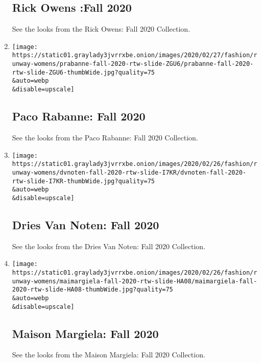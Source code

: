 \begin{enumerate}
{  \subsection{Rick Owens :Fall 2020}\label{rick-owens-fall-2020}}

  See the looks from the Rick Owens: Fall 2020 Collection.
\item
  \href{/slideshow/2020/02/27/fashion/runway-womens/paco-rabanne-fall-2020.html}{}

  \texttt{[image: https://static01.graylady3jvrrxbe.onion/images/2020/02/27/fashion/runway-womens/prabanne-fall-2020-rtw-slide-ZGU6/prabanne-fall-2020-rtw-slide-ZGU6-thumbWide.jpg?quality=75\\\&auto=webp\\\&disable=upscale]}

  \hypertarget{paco-rabanne-fall-2020}{%
  \subsection{Paco Rabanne: Fall 2020}\label{paco-rabanne-fall-2020}}

  See the looks from the Paco Rabanne: Fall 2020 Collection.
\item
  \href{/slideshow/2020/02/26/fashion/runway-womens/dries-van-noten-fall-2020.html}{}

  \texttt{[image: https://static01.graylady3jvrrxbe.onion/images/2020/02/26/fashion/runway-womens/dvnoten-fall-2020-rtw-slide-I7KR/dvnoten-fall-2020-rtw-slide-I7KR-thumbWide.jpg?quality=75\\\&auto=webp\\\&disable=upscale]}

  \hypertarget{dries-van-noten-fall-2020}{%
  \subsection{Dries Van Noten: Fall
  2020}\label{dries-van-noten-fall-2020}}

  See the looks from the Dries Van Noten: Fall 2020 Collection.
\item
  \href{/slideshow/2020/02/26/fashion/runway-womens/maison-margiela-fall-2020.html}{}

  \texttt{[image: https://static01.graylady3jvrrxbe.onion/images/2020/02/26/fashion/runway-womens/maimargiela-fall-2020-rtw-slide-HA08/maimargiela-fall-2020-rtw-slide-HA08-thumbWide.jpg?quality=75\\\&auto=webp\\\&disable=upscale]}

  \hypertarget{maison-margiela-fall-2020}{%
  \subsection{Maison Margiela: Fall
  2020}\label{maison-margiela-fall-2020}}

  See the looks from the Maison Margiela: Fall 2020 Collection.
\end{enumerate}

